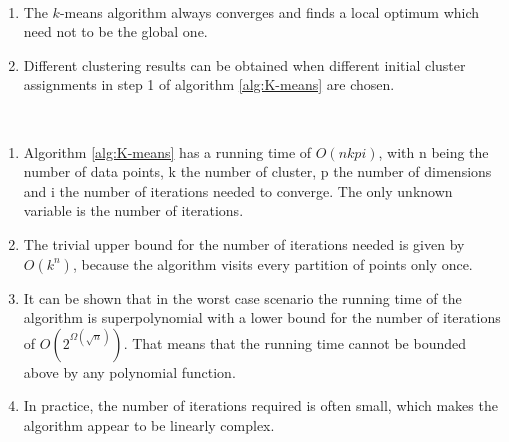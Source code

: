 \begin{remark}~
	\begin{enumerate}[label=(\roman*)]
		\item The $k$-means algorithm always converges and finds a local optimum which need not to be the global one.
		\item Different clustering results can be obtained when different initial cluster assignments in step 1 of algorithm \ref{alg:K-means} are chosen.
	\end{enumerate}
\end{remark}

\begin{remark}~
	\begin{enumerate}[label=(\roman*)]
		\item Algorithm \ref{alg:K-means} has a running time of $O(nkpi)$, with n being the number of data points, k the number of cluster, p the number of dimensions and i the number of iterations needed to converge. The only unknown variable is the number of iterations. 
		\item The trivial upper bound for the number of iterations needed is given by $O(k^n)$, because the algorithm visits every partition of points only once. 
		\item It can be shown \cite{arthur2006slow} that in the worst case scenario the running time of the algorithm is superpolynomial with a lower bound for the number of iterations of $O(2^{\Omega(\sqrt{n})})$. That means that the running time cannot be bounded above by any polynomial function.
		\item In practice, the number of iterations required is often small, which makes the algorithm appear to be linearly complex.  
	\end{enumerate}
\end{remark}

